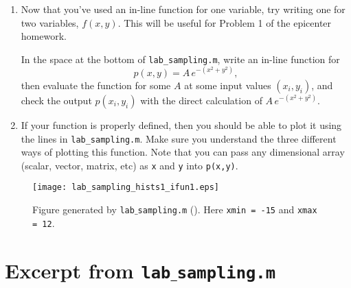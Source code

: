 \documentclass[11pt,titlepage,fleqn]{article}
\begin{document}
\begin{enumerate}
\item Now that you've used an in-line function for one variable, try writing one for two variables, $f(x,y)$. This will be useful for Problem 1 of the epicenter homework.

In the space at the bottom of \verb+lab_sampling.m+, write an in-line function for 
%
\begin{equation*}
p(x,y) = A\,e^{-(x^2+y^2)},
\end{equation*}
%
then evaluate the function for some $A$ at some input values $(x_i,y_i)$, and check the output $p(x_i,y_i)$ with the direct calculation of $A\,e^{-(x^2+y^2)}$.

\item If your function is properly defined, then you should be able to plot it using the lines in \verb+lab_sampling.m+. Make sure you understand the three different ways of plotting this function. Note that you can pass any dimensional array (scalar, vector, matrix, etc) as \verb+x+ and \verb+y+ into \verb+p(x,y)+.

\end{enumerate}


\begin{figure}
\centering
\texttt{[image: lab\_sampling\_hists1\_ifun1.eps]}
\caption[]
{{
Figure generated by {\tt lab$\_$sampling.m} ().
Here {\tt xmin = -15} and {\tt xmax = 12}.
\label{fig}
}}
\end{figure}


\clearpage\pagebreak
\appendix

\section{Excerpt from {\tt lab$\_$sampling.m}}
\label{sec:code}
\end{document}
